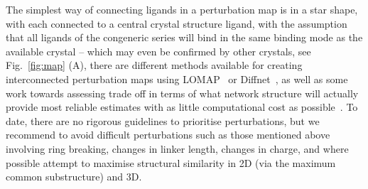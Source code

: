\documentclass[9pt,bestpractices]{livecoms}
\begin{document}
The simplest way of connecting ligands in a perturbation map is in a star shape, with each connected to a central crystal structure ligand, with the assumption that all ligands of the congeneric series will bind in the same binding mode as the available crystal -- which may even be confirmed by other crystals, see Fig.~\ref{fig:map} (A), there are different methods available for creating interconnected perturbation maps using LOMAP~\cite{liu_lead_2013} or Diffnet~\cite{xu_optimal_2019}, as well as some work towards assessing trade off in terms of what network structure will actually provide most reliable estimates with as little computational cost as possible~\cite{yang_optimal_2020, xu_optimal_2019}. To date, there are no rigorous guidelines to prioritise perturbations, but we recommend to avoid difficult perturbations such as those mentioned above involving ring breaking, changes in linker length, changes in charge, and where possible attempt to maximise structural similarity in 2D (via the maximum common substructure) and 3D.
\end{document}

